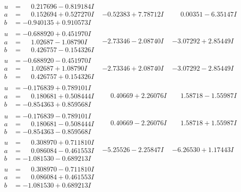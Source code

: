 \documentclass[1p]{elsarticle_modified}
\theoremstyle{definition}
\begin{document}
$$\begin{array}{c|c|c}
\begin{aligned}
u &= \phantom{-}0.217696 - 0.819184 I \\
a &= \phantom{-}0.152694 + 0.527270 I \\
b &= -0.940135 + 0.910573 I\end{aligned}
 & -0.52383 + 7.78712 I & \phantom{-}0.00351 - 6.35147 I \\ \hline\begin{aligned}
u &= -0.688920 + 0.451970 I \\
a &= \phantom{-}1.02687 - 1.08790 I \\
b &= \phantom{-}0.426757 - 0.154326 I\end{aligned}
 & -2.73346 - 2.08740 I & -3.07292 + 2.85449 I \\ \hline\begin{aligned}
u &= -0.688920 - 0.451970 I \\
a &= \phantom{-}1.02687 + 1.08790 I \\
b &= \phantom{-}0.426757 + 0.154326 I\end{aligned}
 & -2.73346 + 2.08740 I & -3.07292 - 2.85449 I \\ \hline\begin{aligned}
u &= -0.176839 + 0.789101 I \\
a &= \phantom{-}0.180681 + 0.508444 I \\
b &= -0.854363 + 0.859568 I\end{aligned}
 & \phantom{-}0.40669 + 2.26076 I & \phantom{-}1.58718 - 1.55987 I \\ \hline\begin{aligned}
u &= -0.176839 - 0.789101 I \\
a &= \phantom{-}0.180681 - 0.508444 I \\
b &= -0.854363 - 0.859568 I\end{aligned}
 & \phantom{-}0.40669 - 2.26076 I & \phantom{-}1.58718 + 1.55987 I \\ \hline\begin{aligned}
u &= \phantom{-}0.308970 + 0.711810 I \\
a &= \phantom{-}0.086084 - 0.461553 I \\
b &= -1.081530 - 0.689213 I\end{aligned}
 & -5.25526 - 2.25847 I & -6.26530 + 1.17443 I \\ \hline\begin{aligned}
u &= \phantom{-}0.308970 - 0.711810 I \\
a &= \phantom{-}0.086084 + 0.461553 I \\
b &= -1.081530 + 0.689213 I\end{aligned}

\end{array}$$
\end{document}

